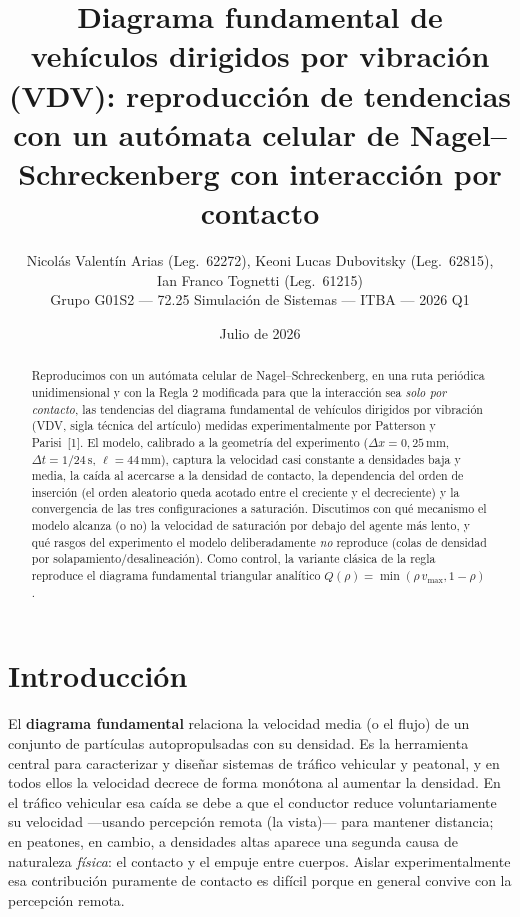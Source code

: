 \documentclass[11pt,a4paper]{article}
\title{\textbf{Diagrama fundamental de vehículos dirigidos por vibración (VDV):
reproducción de tendencias con un autómata celular de Nagel--Schreckenberg
con interacción por contacto}}
\author{Nicolás Valentín Arias (Leg.~62272), Keoni Lucas Dubovitsky (Leg.~62815),\\
        Ian Franco Tognetti (Leg.~61215) \\[3pt]
        Grupo G01S2 --- 72.25 Simulación de Sistemas --- ITBA --- 2026 Q1}
\date{Julio de 2026}
\newcommand{\unit}[1]{\,\mathrm{#1}}
\begin{document}
\maketitle

\begin{abstract}
Reproducimos con un autómata celular de Nagel--Schreckenberg, en una ruta
periódica unidimensional y con la Regla 2 modificada para que la interacción sea
\emph{solo por contacto}, las tendencias del diagrama fundamental de
vehículos dirigidos por vibración (VDV, sigla técnica del artículo) medidas experimentalmente por Patterson y
Parisi~[1]. El modelo, calibrado a la geometría del experimento
($\Delta x=0{,}25\unit{mm}$, $\Delta t=1/24\unit{s}$, $\ell=44\unit{mm}$), captura
la velocidad casi constante a densidades baja y media, la caída al acercarse a la
densidad de contacto, la dependencia del orden de inserción (el orden aleatorio
queda acotado entre el creciente y el decreciente) y la convergencia de las tres
configuraciones a saturación. Discutimos con qué mecanismo el modelo alcanza (o no)
la velocidad de saturación por debajo del agente más lento, y qué rasgos del
experimento el modelo deliberadamente \emph{no} reproduce (colas de densidad por
solapamiento/desalineación). Como control, la variante clásica de la regla reproduce
el diagrama fundamental triangular analítico $Q(\rho)=\min(\rho\,v_{\max},1-\rho)$.
\end{abstract}

\section{Introducción}

El \textbf{diagrama fundamental} relaciona la velocidad media (o el flujo) de un
conjunto de partículas autopropulsadas con su densidad. Es la herramienta central
para caracterizar y diseñar sistemas de tráfico vehicular y peatonal, y en todos
ellos la velocidad decrece de forma monótona al aumentar la densidad. En el tráfico
vehicular esa caída se debe a que el conductor reduce voluntariamente su velocidad
—usando percepción remota (la vista)— para mantener distancia; en peatones, en cambio,
a densidades altas aparece una segunda causa de naturaleza \emph{física}: el contacto
y el empuje entre cuerpos. Aislar experimentalmente esa contribución puramente de
contacto es difícil porque en general convive con la percepción remota.
\end{document}
